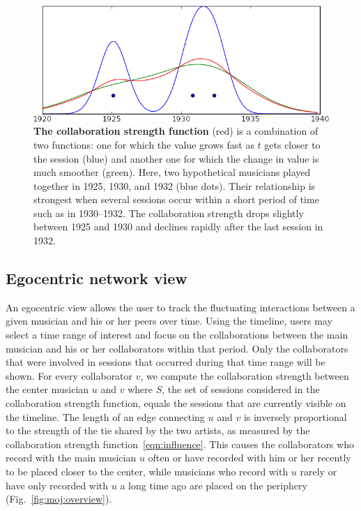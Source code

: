 \documentclass[12pt]{cmuthesis}
\begin{document}
  \begin{figure}[ht]
    \centering
    \includegraphics[width=0.6\linewidth]{figures/influence_plot.png}
    \caption{\textbf{The collaboration strength function} (red) is a combination of two functions: one for which  the value grows fast as $t$ gets closer to the session (blue) and another one for which the change in value is much smoother (green). Here, two hypothetical musicians played together in 1925, 1930, and 1932 (blue dots). Their relationship is strongest when several sessions occur within a short period of time such as in 1930--1932. The collaboration strength drops slightly between 1925 and 1930 and declines rapidly after the last session in 1932.}
    \label{fig:moj:infl_func}
  \end{figure}


  \subsection{Egocentric network view}

  An egocentric view allows the user to track the fluctuating interactions between a given musician and his or her peers over time. Using the timeline, users may select a time range of interest and focus on the collaborations between the main musician and his or her collaborators within that period. Only the collaborators that were involved in sessions that occurred during that time range will be shown. For every collaborator $v$, we compute the collaboration strength between the center musician $u$ and $v$ where $S$, the set of sessions considered in the collaboration strength function, equals the sessions that are currently visible on the timeline. The length of an edge connecting $u$ and $v$ is inversely proportional to the strength of the tie shared by the two artists, as measured by the collaboration strength function~\eqref{eqn:influence}. This causes the collaborators who record with the main musician $u$ often or have recorded with him or her recently to be placed closer to the center, while musicians who record with $u$ rarely or have only recorded with $u$ a long time ago are placed on the periphery (Fig.~\ref{fig:moj:overview}).
\end{document}
